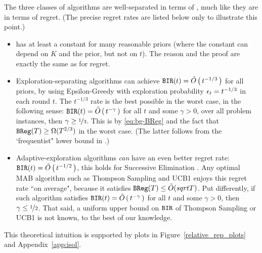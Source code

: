 The three classes of algorithms are well-separated in terms of \BIR, much like they are in terms of regret. (The precise regret rates are listed below only to illustrate this point.)
\begin{itemize}
\item \DynGreedy has at least a constant \BIR for many reasonable priors (where the constant can depend on $K$ and the prior, but not on $t$). The reason and the proof are exactly the same as for regret.

\item Exploration-separating algorithms can achieve
    $\mathtt{BIR}(t) = \tilde{O}\left(\,t^{-1/3}\,\right)$
for all priors, \eg by using Epsilon-Greedy with exploration probability $\epsilon_t = t^{-1/3}$ in each round $t$.
The $t^{-1/3}$ rate is the best possible in the worst case, in the following sense: 
    $\mathtt{BIR}(t) = \tilde{O}\left(\,t^{-\gamma}\,\right)$ 
for all $t$ and some $\gamma>0$,
over all problem instances, then $\gamma\geq \nicefrac{1}{3}$. This is by \eqref{eq:bg-BReg} and the fact that $\mathtt{BReg}(T)\geq \Omega(T^{2/3})$ in the worst case. (The latter follows from the `frequentist" lower bound in \citet{MechMAB-ec09}.)

\item Adaptive-exploration algorithms \emph{can} have an even better regret rate: $\mathtt{BIR}(t) = \tilde{O}\left(\, t^{-1/2} \,\right) $, \eg this holds for Successive Elimination \citep{EvenDar-icml06}. Any optimal MAB algorithm such as Thompson Sampling and UCB1 enjoys this regret rate ``on average", because it satisfies 
        $\mathtt{BReg}(T)\leq \tilde{O}(sqrt{T})$.
    Put differently, if such algorithm satisfies 
        $\mathtt{BIR}(t) = \tilde{O}\left(\,t^{-\gamma}\,\right)$
    for all $t$ and some $\gamma>0$, then $\gamma \leq \nicefrac{1}{2}$.
    That said, a uniform upper bound on $\mathtt{BIR}$ of Thompson Sampling or UCB1 is not known, to the best of our knowledge. 

\end{itemize}

This theoretical intuition is supported by plots in 
Figure~\ref{relative_rep_plots} and Appendix~\ref{app:isol}.


